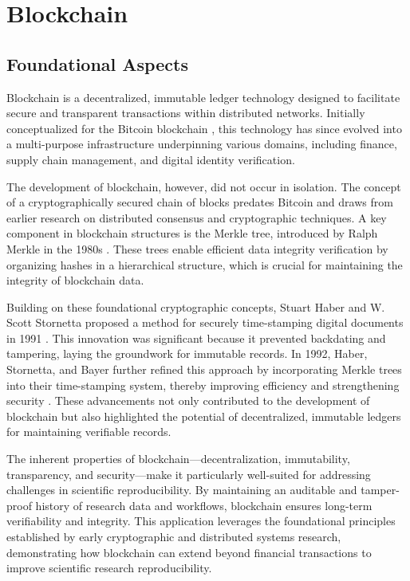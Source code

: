\documentclass{article}
\begin{document}
\section{Blockchain}

\subsection{Foundational Aspects}

Blockchain is a decentralized, immutable ledger technology designed to facilitate secure and transparent transactions within distributed networks. Initially conceptualized for the Bitcoin blockchain \cite{nakamoto2008bitcoin}, this technology has since evolved into a multi-purpose infrastructure underpinning various domains, including finance, supply chain management, and digital identity verification.

The development of blockchain, however, did not occur in isolation. The concept of a cryptographically secured chain of blocks predates Bitcoin and draws from earlier research on distributed consensus and cryptographic techniques. A key component in blockchain structures is the Merkle tree, introduced by Ralph Merkle in the 1980s \cite{goos_digital_1988}. These trees enable efficient data integrity verification by organizing hashes in a hierarchical structure, which is crucial for maintaining the integrity of blockchain data.

Building on these foundational cryptographic concepts, Stuart Haber and W. Scott Stornetta proposed a method for securely time-stamping digital documents in 1991 \cite{haber_how_1991}. This innovation was significant because it prevented backdating and tampering, laying the groundwork for immutable records. In 1992, Haber, Stornetta, and Bayer further refined this approach by incorporating Merkle trees into their time-stamping system, thereby improving efficiency and strengthening security \cite{bayer1993improving}. These advancements not only contributed to the development of blockchain but also highlighted the potential of decentralized, immutable ledgers for maintaining verifiable records.

The inherent properties of blockchain—decentralization, immutability, transparency, and security—make it particularly well-suited for addressing challenges in scientific reproducibility. By maintaining an auditable and tamper-proof history of research data and workflows, blockchain ensures long-term verifiability and integrity. This application leverages the foundational principles established by early cryptographic and distributed systems research, demonstrating how blockchain can extend beyond financial transactions to improve scientific research reproducibility.
\end{document}
